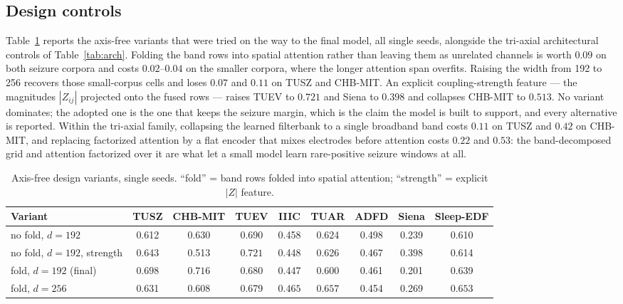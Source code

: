 \subsection{Design controls}
\label{sec:design}

Table~\ref{tab:design} reports the axis-free variants that were tried on
the way to the final model, all single seeds, alongside the tri-axial
architectural controls of Table~\ref{tab:arch}. Folding the band rows
into spatial attention rather than leaving them as unrelated channels is
worth $0.09$ on both seizure corpora and costs $0.02$--$0.04$ on the
smaller corpora, where the longer attention span overfits. Raising the
width from 192 to 256 recovers those small-corpus cells and loses
$0.07$ and $0.11$ on TUSZ and CHB-MIT. An explicit coupling-strength
feature --- the magnitudes $|Z_{ij}|$ projected onto the fused rows ---
raises TUEV to $0.721$ and Siena to $0.398$ and collapses CHB-MIT to
$0.513$. No variant dominates; the adopted one is the one that keeps the
seizure margin, which is the claim the model is built to support, and
every alternative is reported. Within the tri-axial family, collapsing
the learned filterbank to a single broadband band costs $0.11$ on TUSZ
and $0.42$ on CHB-MIT, and replacing factorized attention by a flat
encoder that mixes electrodes before attention costs $0.22$ and $0.53$:
the band-decomposed grid and attention factorized over it are what let a
small model learn rare-positive seizure windows at all.

\begin{table}[t]
\centering
\small
\caption{Axis-free design variants, single seeds. ``fold'' = band rows
folded into spatial attention; ``strength'' = explicit $|Z|$ feature.}
\label{tab:design}
\begin{tabular}{lcccccccc}
\toprule
Variant & TUSZ & CHB-MIT & TUEV & IIIC & TUAR & ADFD & Siena & Sleep-EDF \\
\midrule
no fold, $d{=}192$ & 0.612 & 0.630 & 0.690 & 0.458 & 0.624 & 0.498 & 0.239 & 0.610 \\
no fold, $d{=}192$, strength & 0.643 & 0.513 & $\mathbf{0.721}$ & 0.448 & 0.626 & 0.467 & $\mathbf{0.398}$ & 0.614 \\
fold, $d{=}192$ (final) & $\mathbf{0.698}$ & $\mathbf{0.716}$ & 0.680 & 0.447 & 0.600 & 0.461 & 0.201 & 0.639 \\
fold, $d{=}256$ & 0.631 & 0.608 & 0.679 & $\mathbf{0.465}$ & $\mathbf{0.657}$ & 0.454 & 0.269 & $\mathbf{0.653}$ \\
\bottomrule
\end{tabular}
\end{table}

